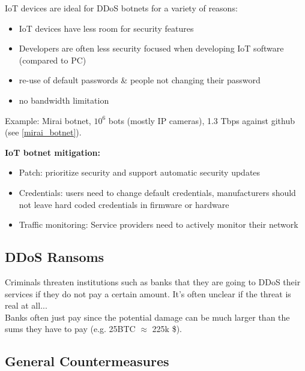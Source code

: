 \documentclass[11pt,oneside,a4paper]{article}
\begin{document}
\noindent IoT devices are ideal for DDoS botnets for a variety of reasons:

\vspace{-\topsep}
\begin{itemize}
	\setlength{\itemsep}{0pt}
	\setlength{\parskip}{0pt}
	\item IoT devices have less room for security features
	\item Developers are often less security focused when developing IoT software (compared to PC)
	\item re-use of default passwords \& people not changing their password
	\item no bandwidth limitation
\end{itemize}
\vspace{-\topsep}

\noindent Example: Mirai botnet, $10^6$ bots (mostly IP cameras), 1.3 Tbps against github (see \ref{mirai_botnet}).

\noindent \textbf{IoT botnet mitigation:}

\vspace{-\topsep}
\begin{itemize}
	\setlength{\itemsep}{0pt}
	\setlength{\parskip}{0pt}
	\item Patch: prioritize security and support automatic security updates
	\item Credentials: users need to change default credentials, manufacturers should not leave hard coded credentials in firmware or hardware
	\item Traffic monitoring: Service providers need to	actively monitor their network
\end{itemize}
\vspace{-\topsep}

\subsection{DDoS Ransoms}

Criminals threaten institutions such as banks that they are going to DDoS their services if they do not pay a certain amount. It's often unclear if the threat is real at all...\\
Banks often just pay since the potential damage can be much larger than the sums they have to pay (e.g. 25BTC $\approx$ 225k \$).

\subsection{General Countermeasures}
\end{document}
